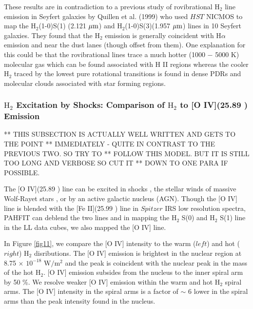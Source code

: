 \documentclass[manuscript]{aastex}
\begin{document}
These results are in contradiction to a previous study of
rovibrational $\mathrm{H_2}$ line emission in Seyfert galaxies by
Quillen et al. (1999) who used $HST$ NICMOS to map the
$\mathrm{H_2}$(1-0)S(1) (2.121 $\mbox{$\mu$m}$) and
$\mathrm{H_2}$(1-0)S(3)(1.957 $\mbox{$\mu$m}$) lines in 10 Seyfert galaxies.
They found that the $\mathrm{H_2}$ emission is generally coincident
with H$\alpha$ emission and near the dust lanes (though offset from
them).  One explanation for this could be that the rovibrational lines
trace a much hotter (1000 $-$ 5000 K) molecular gas which can be found
associated with H II regions whereas the cooler $\mathrm{H_2}$ traced
by the lowest pure rotational transitions is found in dense PDRs and
molecular clouds associated with star forming regions.

\subsubsection{$\mathrm{H_2}$ Excitation by Shocks: Comparison of $\mathrm{H_2}$ to [O IV](25.89 \micron) Emission}

** THIS SUBSECTION IS ACTUALLY WELL WRITTEN AND GETS TO THE POINT
** IMMEDIATELY - QUITE IN CONTRAST TO THE PREVIOUS TWO.  SO TRY TO
** FOLLOW THIS MODEL.  BUT IT IS STILL TOO LONG AND VERBOSE SO CUT IT
** DOWN TO ONE PARA IF POSSIBLE.

The [O IV](25.89 \micron) line can be excited in shocks \citep{ss99},
the stellar winds of massive Wolf-Rayet stars \citep{lutz98}, or by an
active galactic nucleus (AGN)\citep{smi04}.  Though the [O IV] line is
blended with the [Fe II](25.99 \micron) line in $Spitzer$ IRS low
resolution spectra, PAHFIT can deblend the two lines and in mapping
the $\mathrm{H_2}$ S(0) and $\mathrm{H_2}$ S(1) line in the LL data
cubes, we also mapped the [O IV] line.

In Figure \ref{fig11}, we compare the [O IV] intensity to the warm
($left$) and hot ($right$) $\mathrm{H_2}$ disributions.  The [O IV]
emission is brightest in the nuclear region at 8.75 $\times$
$\mathrm{10^{-18}}$ $\mathrm{W/m^2}$ and the peak is coincident with
the nuclear peak in the mass of the hot $\mathrm{H_2}$.  [O IV]
emission subsides from the nucleus to the inner spiral arm by 50 \%.
We resolve weaker [O IV] emission within the warm and hot
$\mathrm{H_2}$ spiral arms.  The [O IV] intensity in the spiral arms
is a factor of $\sim$ 6 lower in the spiral arms than the peak
intensity found in the nucleus.
\end{document}
